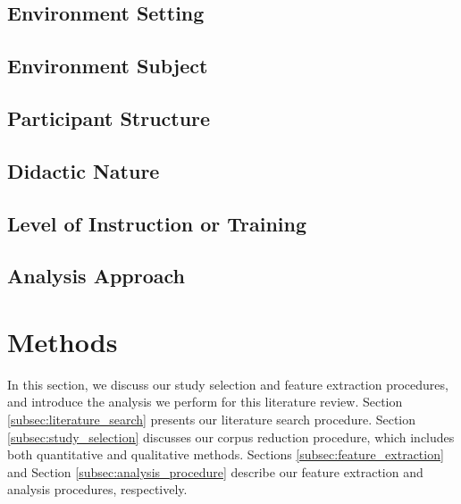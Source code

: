 \documentclass[manuscript,screen,review]{acmart}
\begin{document}
\subsection{Environment Setting}

\subsection{Environment Subject}

\subsection{Participant Structure}


\subsection{Didactic Nature}

\subsection{Level of Instruction or Training}

\subsection{Analysis Approach}

\section{Methods} \label{sec:methods}


In this section, we discuss our study selection and feature extraction procedures, and introduce the analysis we perform for this literature review. Section \ref{subsec:literature_search} presents our literature search procedure. Section \ref{subsec:study_selection} discusses our corpus reduction procedure, which includes both quantitative and qualitative methods. Sections \ref{subsec:feature_extraction} and Section \ref{subsec:analysis_procedure} describe our feature extraction and analysis procedures, respectively.
\end{document}
